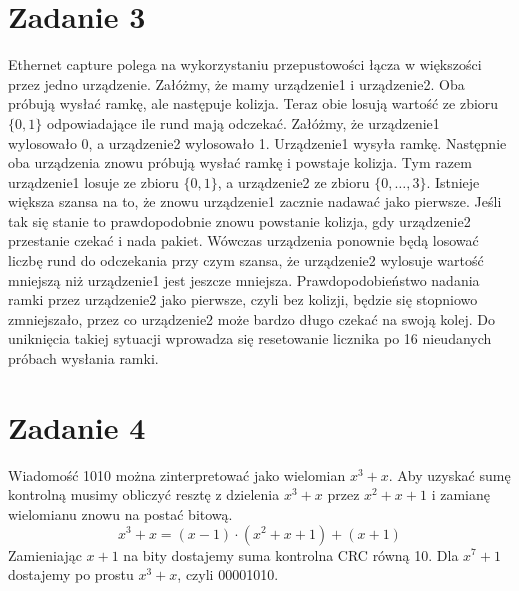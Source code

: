 \documentclass{article}
\begin{document}
\section{Zadanie 3}
Ethernet capture polega na wykorzystaniu przepustowości łącza w większości przez jedno urządzenie. Załóżmy, że mamy urządzenie1 i urządzenie2. Oba próbują wysłać ramkę, ale następuje kolizja. Teraz obie losują wartość ze zbioru $\{ 0, 1 \}$ odpowiadające ile rund mają odczekać. Załóżmy, że urządzenie1 wylosowało 0, a urządzenie2 wylosowało 1. Urządzenie1 wysyła ramkę. Następnie oba urządzenia znowu próbują wysłać ramkę i powstaje kolizja. Tym razem urządzenie1 losuje ze zbioru $\{ 0, 1 \}$, a urządzenie2 ze zbioru $\{ 0, \ldots, 3 \}$. Istnieje większa szansa na to, że znowu urządzenie1 zacznie nadawać jako pierwsze. Jeśli tak się stanie to prawdopodobnie znowu powstanie kolizja, gdy urządzenie2 przestanie czekać i nada pakiet. Wówczas urządzenia ponownie będą losować liczbę rund do odczekania przy czym szansa, że urządzenie2 wylosuje wartość mniejszą niż urządzenie1 jest jeszcze mniejsza. Prawdopodobieństwo nadania ramki przez urządzenie2 jako pierwsze, czyli bez kolizji, będzie się stopniowo zmniejszało, przez co urządzenie2 może bardzo długo czekać na swoją kolej. Do uniknięcia takiej sytuacji wprowadza się resetowanie licznika po 16 nieudanych próbach wysłania ramki.
\section{Zadanie 4}
Wiadomość 1010 można zinterpretować jako wielomian $x^3+x$. Aby uzyskać sumę kontrolną musimy obliczyć resztę z dzielenia $x^3+x$ przez $x^2 + x + 1$ i zamianę wielomianu znowu na postać bitową. 
\begin{equation}
    x^3+x = (x-1)\cdot (x^2 + x + 1) + (x+1)
\end{equation}
Zamieniając $x+1$ na bity dostajemy suma kontrolna CRC równą 10.
Dla $x^7 + 1$ dostajemy po prostu $x^3+x$, czyli 00001010.
\end{document}
